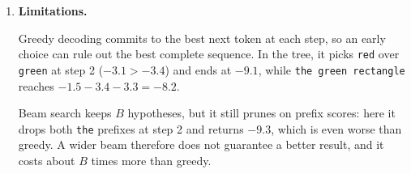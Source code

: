 \documentclass[12pt]{article}
\theoremstyle{definition}
\begin{document}
{\begin{enumerate}[label=\textbf{(\arabic*)}, leftmargin=*]
\begin{enumerate}[label=\textbf{(\alph*)}, leftmargin=*]
        Thus the two sequences are \texttt{a blue square} and
        \texttt{a red circle}, with log-likelihoods $-9.3$ and $-9.4$.
    \end{enumerate}

    \item \textbf{Limitations.}\nopagebreak[4]

    Greedy decoding commits to the best next token at each step, so an
    early choice can rule out the best complete sequence. In the tree, it
    picks \texttt{red} over \texttt{green} at step 2 ($-3.1>-3.4$) and ends
    at $-9.1$, while \texttt{the green rectangle} reaches
    $-1.5-3.4-3.3=-8.2$.

    Beam search keeps $B$ hypotheses, but it still prunes on prefix scores:
    here it drops both \texttt{the} prefixes at step 2 and returns $-9.3$,
    which is even worse than greedy. A wider beam therefore does not
    guarantee a better result, and it costs about $B$ times more than greedy.
\end{enumerate}

}
\end{document}
